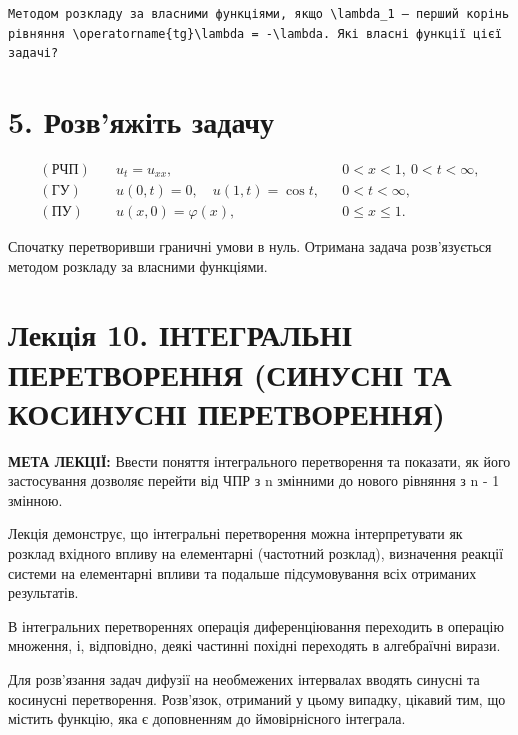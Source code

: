 \documentclass[
  ukrainian,
]{article}
\begin{document}
\begin{verbatim}
Методом розкладу за власними функціями, якщо \lambda_1 — перший корінь рівняння \operatorname{tg}\lambda = -\lambda. Які власні функції цієї задачі?
\end{verbatim}

\section{5. Розв'яжіть
задачу}\label{ux440ux43eux437ux432ux44fux436ux456ux442ux44c-ux437ux430ux434ux430ux447ux443-1}

\[
\begin{aligned}
(\text{РЧП})\quad & u_t = u_{xx}, && 0 < x < 1,\ 0 < t < \infty, \\
(\text{ГУ})\quad & u(0,t) = 0,\quad u(1,t) = \cos t, && 0 < t < \infty, \\
(\text{ПУ})\quad & u(x,0) = \varphi(x), && 0 \leqslant x \leqslant 1.
\end{aligned}
\]

Спочатку перетворивши граничні умови в нуль. Отримана задача
розв'язується методом розкладу за власними функціями.

\section{Лекція 10. ІНТЕГРАЛЬНІ ПЕРЕТВОРЕННЯ (СИНУСНІ ТА КОСИНУСНІ
ПЕРЕТВОРЕННЯ)}\label{ux43bux435ux43aux446ux456ux44f-10.-ux456ux43dux442ux435ux433ux440ux430ux43bux44cux43dux456-ux43fux435ux440ux435ux442ux432ux43eux440ux435ux43dux43dux44f-ux441ux438ux43dux443ux441ux43dux456-ux442ux430-ux43aux43eux441ux438ux43dux443ux441ux43dux456-ux43fux435ux440ux435ux442ux432ux43eux440ux435ux43dux43dux44f}

\textbf{МЕТА ЛЕКЦІЇ:} Ввести поняття інтегрального перетворення та
показати, як його застосування дозволяє перейти від ЧПР з n змінними до
нового рівняння з n - 1 змінною.

Лекція демонструє, що інтегральні перетворення можна інтерпретувати як
розклад вхідного впливу на елементарні (частотний розклад), визначення
реакції системи на елементарні впливи та подальше підсумовування всіх
отриманих результатів.

В інтегральних перетвореннях операція диференціювання переходить в
операцію множення, і, відповідно, деякі частинні похідні переходять в
алгебраїчні вирази.

Для розв'язання задач дифузії на необмежених інтервалах вводять синусні
та косинусні перетворення. Розв'язок, отриманий у цьому випадку, цікавий
тим, що містить функцію, яка є доповненням до ймовірнісного інтеграла.
\end{document}

